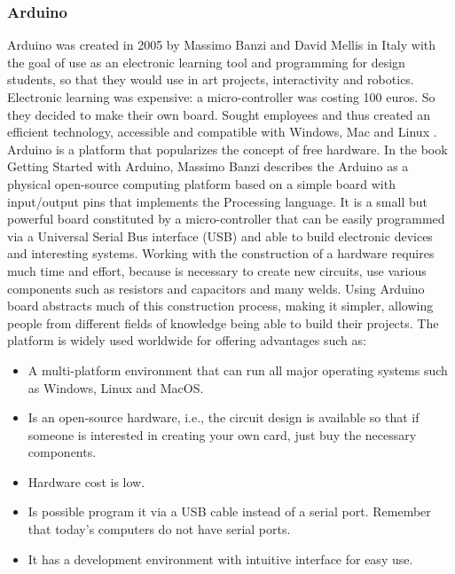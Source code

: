 \documentclass{acm_proc_article-sp}
\begin{document}
\subsubsection{Arduino}
Arduino was created in 2005 by Massimo Banzi and David Mellis in Italy with the goal of use as an electronic learning tool and programming for design students, so that they would use in art projects, interactivity and robotics. Electronic learning was expensive: a micro-controller was costing 100 euros. So they decided to make their own board. Sought employees and thus created an efficient technology, accessible and compatible with Windows, Mac and Linux \cite{netodesenvolvimento}.
\newline
\newline
Arduino is a platform that popularizes the concept of free hardware. In the book Getting Started with Arduino, Massimo Banzi describes the Arduino as a physical open-source computing platform based on a simple board with input/output pins that implements the Processing language. It is a small but powerful board constituted by a micro-controller that can be easily programmed via a Universal Serial Bus interface (USB) and able to build electronic devices and interesting systems.
\newline
\newline
Working with the construction of a hardware requires much time and effort, because is necessary to create new circuits, use various components such as resistors and capacitors and many welds. Using Arduino board abstracts much of this construction process, making it simpler, allowing people from different fields of knowledge being able to build their projects. The platform is widely used worldwide for offering advantages such as:


\begin{itemize}
\item A multi-platform environment that can run all major operating systems such as Windows, Linux and MacOS.
\item Is an open-source hardware, i.e., the circuit design is available so that if someone is interested in creating your own card, just buy the necessary components.		
\item Hardware cost is low.					
\item Is possible program it via a USB cable instead of a serial port. Remember that today's computers do not have serial ports.	
\item It has a development environment with intuitive interface for easy use.
\end{itemize}
\end{document}
